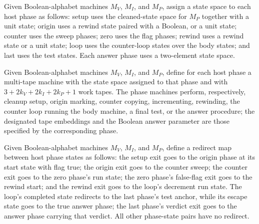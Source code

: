 \begin{definition}
\label{Complexity.b2b_hostState}
\leanok
{}
Given Boolean-alphabet machines $M_V$, $M_I$, and $M_P$, assign a state space to each
host phase as follows: setup uses the cleaned-state space for $M_P$ together with a unit
state; origin uses a rewind state paired with a Boolean, or a unit state; counter uses
the sweep phases; zero uses the flag phases; rewind uses a rewind state or a unit state;
loop uses the counter-loop states over the body states; and last uses the test states.
Each answer phase uses a two-element state space.
\end{definition}

\begin{definition}
\label{Complexity.b2b_hostPhases}
\leanok
{}
Given Boolean-alphabet machines $M_V$, $M_I$, and $M_P$, define for each host phase a
multi-tape machine with the state space assigned to that phase and with
$3+2k_V+2k_I+2k_P+1$ work tapes. The phase machines perform, respectively, cleanup
setup, origin marking, counter copying, incrementing, rewinding, the counter loop
running the body machine, a final test, or the answer procedure; the designated tape
embeddings and the Boolean answer parameter are those specified by the corresponding
phase.
\end{definition}

\begin{definition}
\label{Complexity.b2b_hostRedirect}
\leanok
{}
Given Boolean-alphabet machines $M_V$, $M_I$, and $M_P$, define a redirect map between
host phase states as follows: the setup exit goes to the origin phase at its start state
with flag true; the origin exit goes to the counter sweep; the counter exit goes to the
zero phase's run state; the zero phase's false-flag exit goes to the rewind start; and
the rewind exit goes to the loop's decrement run state. The loop's completed state
redirects to the last phase's test anchor, while its escape state goes to the true
answer phase; the last phase's verdict exit goes to the answer phase carrying that
verdict. All other phase-state pairs have no redirect.
\end{definition}

